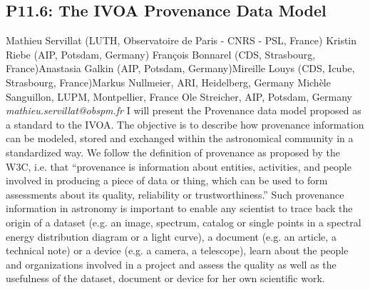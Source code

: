\documentclass{report}
\begin{document}
\subsection*{P11.6: The IVOA Provenance Data Model}
\bigskip
Mathieu Servillat (LUTH, Observatoire de Paris - CNRS - PSL, France) \newline Kristin Riebe (AIP, Potsdam, Germany) \newline  François Bonnarel (CDS, Strasbourg, France)\newline  Anastasia Galkin (AIP, Potsdam, Germany)\newline Mireille Louys (CDS, Icube, Strasbourg, France)\newline  Markus Nullmeier, ARI, Heidelberg, Germany
Michèle Sanguillon, LUPM, Montpellier, France
Ole Streicher, AIP, Potsdam, Germany\newline\newline
{\it mathieu.servillat@obspm.fr}\newline
\newline\newline
I will present the Provenance data model proposed as a standard to the IVOA. The objective is to describe how provenance information can be modeled, stored and exchanged within the astronomical community in a standardized way.
We follow the definition of provenance as proposed by the W3C, i.e. that ``provenance is information about entities, activities, and people involved in producing a piece of data or thing, which can be used to form assessments about its quality, reliability or trustworthiness.''
Such provenance information in astronomy is important to enable any scientist to trace back the origin of a dataset (e.g. an image, spectrum, catalog or single points in a spectral energy distribution diagram or a light curve), a document (e.g. an article, a technical note) or a device (e.g. a camera, a telescope), learn about the people and organizations involved in a project and assess the quality as well as the usefulness of the dataset, document or device for her own scientific work.\newline
\newpage
\end{document}
